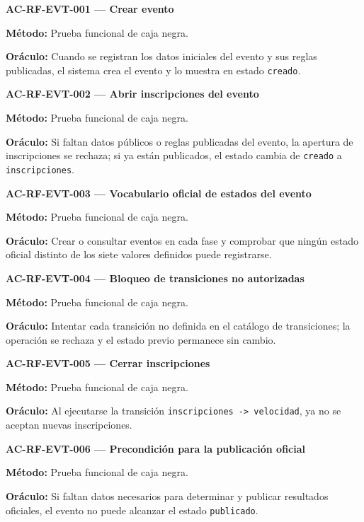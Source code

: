 \documentclass[10pt,letterpaper]{article}
\begin{document}
\noindent\textbf{AC-RF-EVT-001 --- Crear evento}\par
\textbf{Método:} Prueba funcional de caja negra.\par
\textbf{Oráculo:} Cuando se registran los datos iniciales del evento y sus reglas publicadas, el sistema crea el evento y lo muestra en estado \texttt{creado}.\par\vspace{0.45em}
\noindent\textbf{AC-RF-EVT-002 --- Abrir inscripciones del evento}\par
\textbf{Método:} Prueba funcional de caja negra.\par
\textbf{Oráculo:} Si faltan datos públicos o reglas publicadas del evento, la apertura de inscripciones se rechaza; si ya están publicados, el estado cambia de \texttt{creado} a \texttt{inscripciones}.\par\vspace{0.45em}
\noindent\textbf{AC-RF-EVT-003 --- Vocabulario oficial de estados del evento}\par
\textbf{Método:} Prueba funcional de caja negra.\par
\textbf{Oráculo:} Crear o consultar eventos en cada fase y comprobar que ningún estado oficial distinto de los siete valores definidos puede registrarse.\par\vspace{0.45em}
\noindent\textbf{AC-RF-EVT-004 --- Bloqueo de transiciones no autorizadas}\par
\textbf{Método:} Prueba funcional de caja negra.\par
\textbf{Oráculo:} Intentar cada transición no definida en el catálogo de transiciones; la operación se rechaza y el estado previo permanece sin cambio.\par\vspace{0.45em}
\noindent\textbf{AC-RF-EVT-005 --- Cerrar inscripciones}\par
\textbf{Método:} Prueba funcional de caja negra.\par
\textbf{Oráculo:} Al ejecutarse la transición \texttt{inscripciones -> velocidad}, ya no se aceptan nuevas inscripciones.\par\vspace{0.45em}
\noindent\textbf{AC-RF-EVT-006 --- Precondición para la publicación oficial}\par
\textbf{Método:} Prueba funcional de caja negra.\par
\textbf{Oráculo:} Si faltan datos necesarios para determinar y publicar resultados oficiales, el evento no puede alcanzar el estado \texttt{publicado}.\par\vspace{0.45em}
\end{document}
